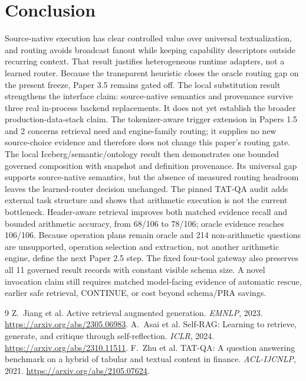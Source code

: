 \documentclass[11pt]{article}
\begin{document}
\section{Conclusion}
Source-native execution has clear controlled value over universal
textualization, and routing avoids broadcast fanout while keeping capability
descriptors outside recurring context. That result justifies heterogeneous
runtime adapters, not a learned router. Because the transparent heuristic closes
the oracle routing gap on the present freeze, Paper 3.5 remains gated off. The
local substitution result strengthens the interface claim: source-native
semantics and provenance survive three real in-process backend replacements. It
does not yet establish the broader production-data-stack claim.
The tokenizer-aware trigger extension in Papers 1.5 and 2 concerns retrieval
need and engine-family routing; it supplies no new source-choice evidence and
therefore does not change this paper's routing gate.
The local Iceberg/semantic/ontology result then demonstrates one bounded
governed composition with snapshot and definition provenance. Its universal
gap supports source-native semantics, but the absence of measured routing
headroom leaves the learned-router decision unchanged.
The pinned TAT-QA audit adds external task structure and shows that arithmetic
execution is not the current bottleneck. Header-aware retrieval improves both
matched evidence recall and bounded arithmetic accuracy, from 68/106 to 78/106;
oracle evidence reaches 106/106. Because operation plans remain oracle and 214
non-arithmetic questions are unsupported, operation selection and extraction,
not another arithmetic engine, define the next Paper 2.5 step.
The fixed four-tool gateway also preserves all 11 governed result records with
constant visible schema size. A novel invocation claim still requires matched
model-facing evidence of automatic rescue, earlier safe retrieval, CONTINUE, or
cost beyond schema/PRA savings.

\begin{thebibliography}{9}
Z.~Jiang et al. Active retrieval augmented generation. \emph{EMNLP}, 2023.
\url{https://arxiv.org/abs/2305.06983}.
A.~Asai et al. Self-RAG: Learning to retrieve, generate, and critique through
self-reflection. \emph{ICLR}, 2024.
\url{https://arxiv.org/abs/2310.11511}.
F.~Zhu et al. TAT-QA: A question answering benchmark on a hybrid of tabular and
textual content in finance. \emph{ACL-IJCNLP}, 2021.
\url{https://arxiv.org/abs/2105.07624}.
\end{thebibliography}
\end{document}
